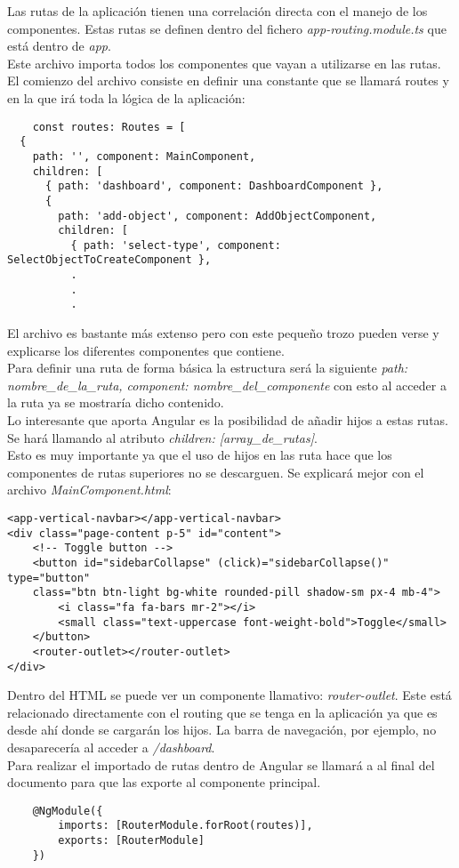 Las rutas de la aplicación tienen una correlación directa con el manejo de los componentes. Estas rutas se definen dentro del fichero \textit{app-routing.module.ts} que está dentro de \textit{app}.
\\Este archivo importa todos los componentes que vayan a utilizarse en las rutas. El comienzo del archivo consiste en definir una constante que se llamará routes y en la que irá toda la lógica de la aplicación:
\begin{verbatim}
    const routes: Routes = [
  {
    path: '', component: MainComponent,
    children: [
      { path: 'dashboard', component: DashboardComponent },
      {
        path: 'add-object', component: AddObjectComponent,
        children: [
          { path: 'select-type', component: SelectObjectToCreateComponent },
          .
          .
          .
\end{verbatim}
El archivo es bastante más extenso pero con este pequeño trozo pueden verse y explicarse los diferentes componentes que contiene.
\\Para definir una ruta de forma básica la estructura será la siguiente \textit{path: nombre\_de\_la\_ruta, component: nombre\_del\_componente} con esto al acceder a la ruta ya se mostraría dicho contenido.
\\Lo interesante que aporta Angular es la posibilidad de añadir hijos a estas rutas. Se hará llamando al atributo \textit{children: [array\_de\_rutas]}.
\\Esto es muy importante ya que el uso de hijos en las ruta hace que los componentes de rutas superiores no se descarguen. Se explicará mejor con el archivo \textit{MainComponent.html}:
\begin{verbatim}
<app-vertical-navbar></app-vertical-navbar>
<div class="page-content p-5" id="content">
    <!-- Toggle button -->
    <button id="sidebarCollapse" (click)="sidebarCollapse()" type="button"
    class="btn btn-light bg-white rounded-pill shadow-sm px-4 mb-4">
        <i class="fa fa-bars mr-2"></i>
        <small class="text-uppercase font-weight-bold">Toggle</small>
    </button>
    <router-outlet></router-outlet>
</div>
\end{verbatim}
Dentro del HTML se puede ver un componente llamativo: \textit{router-outlet}. Este está relacionado directamente con el routing que se tenga en la aplicación ya que es desde ahí donde se cargarán los hijos. La barra de navegación, por ejemplo, no desaparecería al acceder a \textit{/dashboard}.
\\Para realizar el importado de rutas dentro de Angular se llamará a \textit{\makeatletter@NgModule} al final del documento para que las exporte al componente principal.
\begin{verbatim}
    @NgModule({
        imports: [RouterModule.forRoot(routes)],
        exports: [RouterModule]
    })
\end{verbatim}